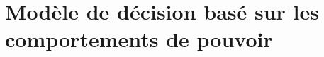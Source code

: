 \documentclass[a4paper, 11pt]{book}
\begin{document}
	

%		
%	
	
	\chapter{Modèle de décision basé sur les comportements de pouvoir}
	\minitoc
	
	
	\label{chap:dec}
	
	
\end{document}
